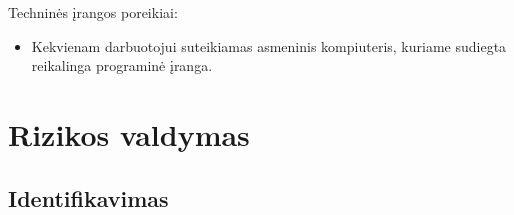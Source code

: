 \documentclass[a4paper,12pt]{article}
\begin{document}
Techninės įrangos poreikiai:
\begin{itemize}
\item Kekvienam darbuotojui suteikiamas asmeninis kompiuteris, kuriame sudiegta reikalinga programinė įranga.
\end{itemize}

\clearpage

\section{Rizikos valdymas}

\subsection{Identifikavimas}



\FloatBarrier
\end{document}
